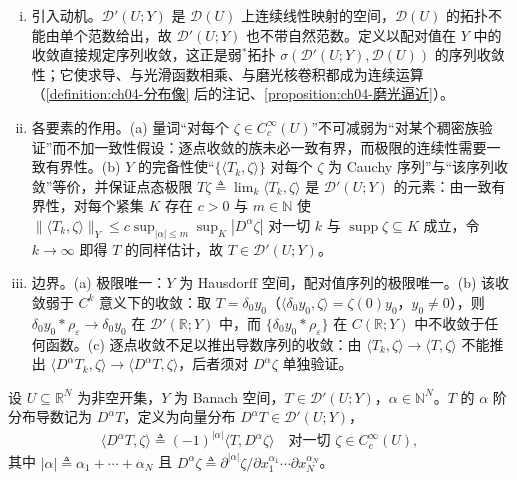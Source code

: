 \documentclass[../../main.tex]{subfiles}%
\begin{document}
\begin{remark}\label{remark:ch04-分布收敛动机}
\begin{enumerate}[(i)]
\item 引入动机。$\mathcal{D}'(U;Y)$ 是 $\mathcal{D}(U)$ 上连续线性映射的空间，$\mathcal{D}(U)$ 的拓扑不能由单个范数给出，故 $\mathcal{D}'(U;Y)$ 也不带自然范数。定义以配对值在 $Y$ 中的收敛直接规定序列收敛，这正是弱$^*$拓扑 $\sigma(\mathcal{D}'(U;Y),\mathcal{D}(U))$ 的序列收敛性；它使求导、与光滑函数相乘、与磨光核卷积都成为连续运算（\cref{definition:ch04-分布像} 后的注记、\cref{proposition:ch04-磨光逼近}）。

\item 各要素的作用。(a) 量词“对每个 $\zeta\in C_c^\infty(U)$”不可减弱为“对某个稠密族验证”而不加一致性假设：逐点收敛的族未必一致有界，而极限的连续性需要一致有界性。(b) $Y$ 的完备性使“$\{\langle T_k,\zeta\rangle\}$ 对每个 $\zeta$ 为 Cauchy 序列”与“该序列收敛”等价，并保证点态极限 $T\zeta\triangleq\lim_k\langle T_k,\zeta\rangle$ 是 $\mathcal{D}'(U;Y)$ 的元素：由一致有界性，对每个紧集 $K$ 存在 $c>0$ 与 $m\in\mathbb{N}$ 使 $\|\langle T_k,\zeta\rangle\|_Y\leqslant c\sup_{|\alpha|\leqslant m}\sup_K|D^\alpha\zeta|$ 对一切 $k$ 与 $\operatorname{supp}\zeta\subseteq K$ 成立，令 $k\to\infty$ 即得 $T$ 的同样估计，故 $T\in\mathcal{D}'(U;Y)$。

\item 边界。(a) 极限唯一：$Y$ 为 Hausdorff 空间，配对值序列的极限唯一。(b) 该收敛弱于 $C^k$ 意义下的收敛：取 $T=\delta_0y_0$（$\langle\delta_0y_0,\zeta\rangle=\zeta(0)y_0$，$y_0\neq0$），则 $\delta_0y_0*\rho_\varepsilon\to\delta_0y_0$ 在 $\mathcal{D}'(\mathbb{R};Y)$ 中，而 $\{\delta_0y_0*\rho_\varepsilon\}$ 在 $C(\mathbb{R};Y)$ 中不收敛于任何函数。(c) 逐点收敛不足以推出导数序列的收敛：由 $\langle T_k,\zeta\rangle\to\langle T,\zeta\rangle$ 不能推出 $\langle D^\alpha T_k,\zeta\rangle\to\langle D^\alpha T,\zeta\rangle$，后者须对 $D^\alpha\zeta$ 单独验证。
\end{enumerate}
\end{remark}

\begin{definition}[分布导数]\label{definition:ch04-分布导数}
设 $U\subseteq\mathbb{R}^N$ 为非空开集，$Y$ 为 Banach 空间，$T\in\mathcal{D}'(U;Y)$，$\alpha\in\mathbb{N}^N$。$T$ 的 $\alpha$ 阶分布导数记为 $D^\alpha T$，定义为向量分布 $D^\alpha T\in\mathcal{D}'(U;Y)$，
\begin{align*}
\langle D^\alpha T,\zeta\rangle\triangleq(-1)^{|\alpha|}\langle T,D^\alpha\zeta\rangle\quad\text{对一切 }\zeta\in C_c^\infty(U),
\end{align*}
其中 $|\alpha|\triangleq\alpha_1+\cdots+\alpha_N$ 且 $D^\alpha\zeta\triangleq\partial^{|\alpha|}\zeta/\partial x_1^{\alpha_1}\cdots\partial x_N^{\alpha_N}$。
\end{definition}
\end{document}
